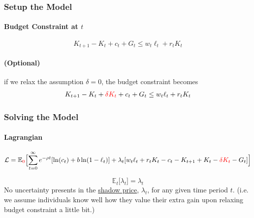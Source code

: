 \documentclass[11pt]{article}
\newcommand{\expat}[2]{\mathbb{E}_{#1}\Big[{#2}\Big]}
\begin{document}
		\subsubsection{Setup the Model}
			\paragraph{Budget Constraint at $t$}
			\begin{equation}
				K_{t+1} - K_t + c_t + G_t \leq w_t \ell_t + r_t K_t
			\end{equation}
			\paragraph{(Optional)} if we relax the assumption $\delta = 0$, the budget constraint becomes
			\begin{equation}
				K_{t+1} - K_t + \textcolor{red}{\delta K_t} + c_t + G_t \leq w_t \ell_t + r_t K_t
			\end{equation}
		\subsubsection{Solving the Model}
			\paragraph{Lagrangian}
			\begin{equation}
				\mc{L} = \expat{\textcolor{red}{0}}{\sum_{t=0}^\infty e^{-\rho t}[\ln(c_t) + b \ln(1-\ell_t)] + \lambda_t [w_t \ell_t + r_t K_t - c_t - K_{t+1} + K_t - \textcolor{red}{\delta K_t} - G_t]}
			\end{equation}

			\begin{remark}
				\[
					\expat{t}{\lambda_t} = \lambda_t
				\]
				No uncertainty presents in the \ul{shadow price}, $\lambda_t$, for any given time period $t$. (i.e. we assume individuals know well how they value their extra gain upon relaxing budget constraint a little bit.)
			\end{remark}
\end{document}
